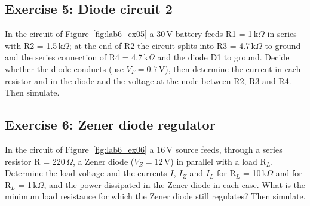 

\subsection{Exercise 5: Diode circuit 2}
In the circuit of Figure~\ref{fig:lab6_ex05} a 30\,V battery feeds R1 = 1\,k$\Omega$ in series with R2 = 1.5\,k$\Omega$; at the end of R2 the circuit splits into R3 = 4.7\,k$\Omega$ to ground and the series connection of R4 = 4.7\,k$\Omega$ and the diode D1 to ground. Decide whether the diode conducts (use $V_F=0.7$\,V), then determine the current in each resistor and in the diode and the voltage at the node between R2, R3 and R4. Then simulate.






\subsection{Exercise 6: Zener diode regulator}
In the circuit of Figure~\ref{fig:lab6_ex06} a 16\,V source feeds, through a series resistor R = 220\,$\Omega$, a Zener diode ($V_Z=12$\,V) in parallel with a load R$_L$. Determine the load voltage and the currents $I$, $I_Z$ and $I_L$ for R$_L$ = 10\,k$\Omega$ and for R$_L$ = 1\,k$\Omega$, and the power dissipated in the Zener diode in each case. What is the minimum load resistance for which the Zener diode still regulates? Then simulate.

